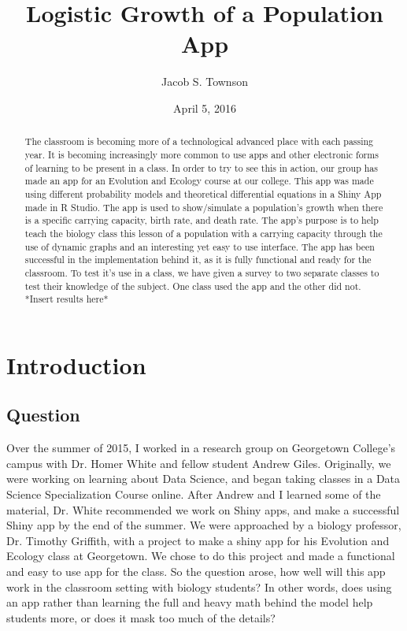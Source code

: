 \documentclass{article}\usepackage[]{graphicx}\usepackage[]{color}
\begin{document}
\title{Logistic Growth of a Population App}
\author{Jacob S. Townson}
\date{April 5, 2016}
\maketitle


\begin{abstract}

The classroom is becoming more of a technological advanced place with each passing year. It is becoming increasingly more common to use apps and other electronic forms of learning to be present in a class. In order to try to see this in action, our group has made an app for an Evolution and Ecology course at our college. This app was made using different probability models and theoretical differential equations in a Shiny App made in R Studio. The app is used to show/simulate a population's growth when there is a specific carrying capacity, birth rate, and death rate. The app's purpose is to help teach the biology class this lesson of a population with a carrying capacity through the use of dynamic graphs and an interesting yet easy to use interface. The app has been successful in the implementation behind it, as it is fully functional and ready for the classroom. To test it's use in a class, we have given a survey to two separate classes to test their knowledge of the subject. One class used the app and the other did not. *Insert results here*

\end{abstract}

\pagebreak

\tableofcontents

\pagebreak

\section{Introduction}

\subsection{Question}

Over the summer of 2015, I worked in a research group on Georgetown College's campus with Dr. Homer White and fellow student Andrew Giles. Originally, we were working on learning about Data Science, and began taking classes in a Data Science Specialization Course online. After Andrew and I learned some of the material, Dr. White recommended we work on Shiny apps, and make a successful Shiny app by the end of the summer. We were approached by a biology professor, Dr. Timothy Griffith, with a project to make a shiny app for his Evolution and Ecology class at Georgetown. We chose to do this project and made a functional and easy to use app for the class. So the question arose, how well will this app work in the classroom setting with biology students? In other words, does using an app rather than learning the full and heavy math behind the model help students more, or does it mask too much of the details?
\end{document}
